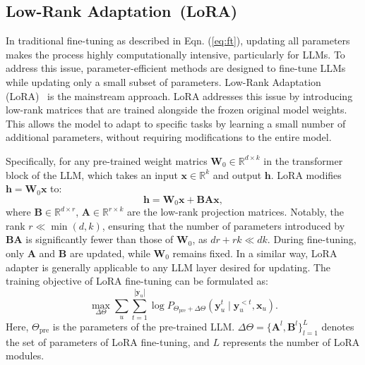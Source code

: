 \subsection{Low-Rank Adaptation~(LoRA)}
In traditional fine-tuning as described in Eqn. (\ref{eq:ft}), updating all parameters makes the process highly computationally intensive, particularly for LLMs.
To address this issue, parameter-efficient methods are designed to fine-tune LLMs while updating only a small subset of parameters.
Low-Rank Adaptation (LoRA)~\cite{hu2022lora} is the mainstream approach. LoRA addresses this issue by introducing low-rank matrices that are trained alongside the frozen original model weights. This allows the model to adapt to specific tasks by learning a small number of additional parameters, without requiring modifications to the entire model.

Specifically, for any pre-trained weight matrics $\boldsymbol{W}_0 \in \mathbb{R}^{d \times k}$ in the transformer block of the LLM, which takes an input $\boldsymbol{x} \in \mathbb{R}^k$ and output $\boldsymbol{h}$. LoRA modifies  $\boldsymbol{h} = \boldsymbol{W}_0 \boldsymbol{x}$ to:
\begin{equation}
    \boldsymbol{h} = \boldsymbol{W}_0 \boldsymbol{x} + \boldsymbol{B}\boldsymbol{A}\boldsymbol{x},
\end{equation}
where $\boldsymbol{B}\in \mathbb{R}^{d \times r}$, $\boldsymbol{A}\in \mathbb{R}^{r \times k}$ are the low-rank projection matrices. Notably, the rank $r \ll \min (d, k)$, ensuring that the number of parameters introduced by $\boldsymbol{B}\boldsymbol{A}$ is significantly fewer than those of $\boldsymbol{W}_0$, as $dr + rk \ll dk$. During fine-tuning, only $\boldsymbol{A}$ and $\boldsymbol{B}$ are updated, while $\boldsymbol{W}_0$ remains fixed. In a similar way, LoRA adapter is generally applicable to any LLM layer desired for updating. The training objective of LoRA fine-tuning can be formulated as:
\begin{equation}
\max _{\Delta\Theta} \sum_{u} \sum_{t=1}^{|\mathbf{y}_u|} \log P_{\Theta_{\text{pre}} +\Delta\Theta }\left(\mathbf{y}_u^t \mid \mathbf{y}^{<t}_u, \mathbf{x}_u\right).
\end{equation}
Here, $\Theta_{\text{pre}}$ is the parameters of the pre-trained LLM. $\Delta\Theta=\{\boldsymbol{A}^l,\boldsymbol{B}^l\}_{l=1}^L$ denotes the set of parameters of LoRA fine-tuning, and $L$ represents the number of LoRA modules.

